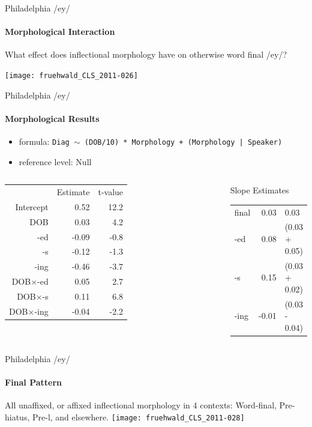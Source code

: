 \documentclass[]{beamer}
\begin{document}
\begin{frame}{Philadelphia /ey/}
	\framesubtitle{Morphological Interaction}

What effect does inflectional morphology have on otherwise word final /ey/?

\texttt{[image: fruehwald\_CLS\_2011-026]}
		
\end{frame}

\begin{frame}{Philadelphia /ey/}
	\framesubtitle{Morphological Results}
	\begin{itemize}
		\item [] formula: \texttt{\footnotesize Diag $\sim$ (DOB/10) * Morphology + (Morphology | Speaker)}
		\item [] reference level: Null
	\end{itemize}
	\begin{columns}[c]
		\column{0.49\paperwidth}
	\begin{tabular}{rrr}
		\toprule
		&Estimate & t-value\\
	\cmidrule{2-3}
	Intercept & 0.52 & 12.2\\
	DOB 	  & 0.03 & 4.2\\
	\midrule
	-ed & -0.09 & -0.8 \\
	-s  & -0.12 & -1.3\\
	-ing & -0.46 & -3.7\\
	\midrule
	DOB$\times$-ed & 0.05 & 2.7\\
	DOB$\times$-s     & 0.11 & 6.8\\
	DOB$\times$-ing   & -0.04 & -2.2\\
	\bottomrule
	\end{tabular}
		\column{0.49\paperwidth}
		\begin{block}{Slope Estimates}
			\begin{tabular}{lr@{=}l}
				final &  0.03 &  0.03\\
				-ed & 0.08 & (0.03 + 0.05) \\
				-s & 0.15 & (0.03 + 0.02) \\
				-ing & -0.01 & (0.03 - 0.04)
			\end{tabular}
		\end{block}
	\end{columns}
\end{frame}



\begin{frame}{Philadelphia /ey/}
	\framesubtitle{Final Pattern}
All unaffixed, or affixed inflectional morphology in 4 contexts: Word-final, Pre-hiatus, Pre-l, and elsewhere.
\texttt{[image: fruehwald\_CLS\_2011-028]}
		
\end{frame}
\end{document}
